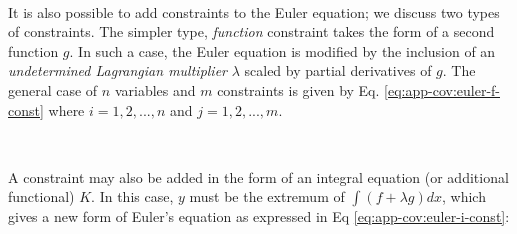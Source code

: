 \


It is also possible to add constraints to the Euler equation; we discuss two types of constraints. The simpler type, \textit{function} constraint takes the form of a second function $g$. In such a case, the Euler equation is modified by the inclusion of an \textit{undetermined Lagrangian multiplier} $\lambda$ scaled by partial derivatives of $g$. The general case of $n$ variables and $m$ constraints is given by Eq. \ref{eq:app-cov:euler-f-const} where $i = 1, 2, ..., n$ and $j = 1, 2, ..., m$.


\

A constraint may also be added in the form of an integral equation (or additional functional) $K$. In this case, $y$ must be the extremum of $\int(f + \lambda g)dx$, which gives a new form of Euler's equation as expressed in Eq \ref{eq:app-cov:euler-i-const}:

\

